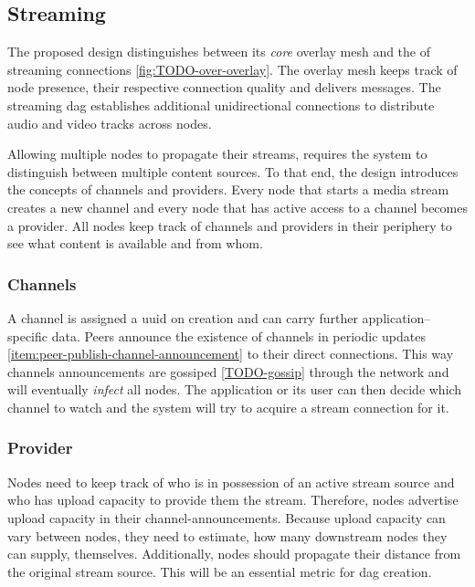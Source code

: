 \subsection{Streaming}\label{sec:design-stream}

The proposed design distinguishes between its \textit{core} overlay mesh and the  of streaming connections \ref{fig:TODO-over-overlay}. The overlay mesh keeps track of node presence, their respective connection quality and delivers messages. The streaming \gls{dag} establishes additional unidirectional connections to distribute audio and video tracks across nodes.


Allowing multiple nodes to propagate their streams, requires the system to distinguish between multiple content sources. To that end, the design introduces the concepts of channels and providers. Every node that starts a media stream creates a new channel and every node that has active access to a channel becomes a provider. All nodes keep track of channels and providers in their periphery to see what content is available and from whom.

\subsubsection{Channels}\label{sec:design-stream-channel}
A channel is assigned a \gls{uuid} on creation and can carry further application–specific data. Peers announce the existence of channels in periodic updates \ref{item:peer-publish-channel-announcement} to their direct connections. This way channels announcements are gossiped \ref{TODO-gossip} through the network and will eventually \textit{infect} all nodes. The application or its user can then decide which channel to watch and the system will try to acquire a stream connection for it.

\subsubsection{Provider}\label{sec:design-stream-provider}
Nodes need to keep track of who is in possession of an active stream source and who has upload capacity to provide them the stream. Therefore, nodes advertise upload capacity in their \glspl{channel-announcement}. Because upload capacity can vary between nodes, they need to estimate, how many downstream nodes they can supply, themselves. Additionally, nodes should propagate their distance from the original stream source. This will be an essential metric for \gls{dag} creation.

